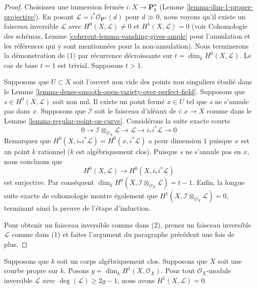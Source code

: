 \begin{proof}
Choisissez une immersion fermée $i : X \to
\mathbf{P}^n_k$ (Lemme
\ref{lemma-dim-1-proper-projective}). En posant $\mathcal{L} =
i^*\mathcal{O}_{\mathbf{P}^n}(d)$ pour $d \gg 0$, nous voyons
qu'il existe un faisceau inversible $\mathcal{L}$ avec $H^0(X,
\mathcal{L}) \not = 0$ et $H^1(X, \mathcal{L}) = 0$ (voir
Cohomologie des schémas, Lemme
\ref{coherent-lemma-vanshing-gives-ample} pour l'annulation et les
références qui y sont mentionnées pour la non-annulation). Nous
terminerons la démonstration de (1) par récurrence décroissante sur $t =
\dim_k H^0(X, \mathcal{L})$. Le cas de base $t = 1$ est trivial. Supposons $t > 1$.

\medskip\noindent
Supposons que $U \subset X$ soit l'ouvert non vide des points
non singuliers étudié dans le Lemme
\ref{lemma-dense-smooth-open-variety-over-perfect-field}. Supposons
que $s \in H^0(X, \mathcal{L})$ soit non nul. Il existe un point fermé
$x \in U$ tel que $s$ ne s'annule pas dans $x$. Supposons que
$\mathcal{I}$ soit le faisceau d'idéaux de $i : x \to X$ comme dans le
Lemme \ref{lemma-regular-point-on-curve}. Considérons la suite exacte courte
$$
0 \to \mathcal{I} \otimes_{\mathcal{O}_X} \mathcal{L} \to
\mathcal{L} \to i_*i^*\mathcal{L} \to 0
$$
Remarquez que $H^0(X, i_*i^*\mathcal{L}) = H^0(x, i^*\mathcal{L})$ a
pour dimension $1$ puisque $x$ est un point $k$ rationnel ($k$ est
algébriquement clos). Puisque $s$ ne s'annule pas en $x$, nous concluons que
$$
H^0(X, \mathcal{L}) \longrightarrow H^0(X, i_*i^*\mathcal{L})
$$
est surjective. Par conséquent $\dim_k H^0(X,
\mathcal{I} \otimes_{\mathcal{O}_X} \mathcal{L}) = t - 1$.
Enfin, la longue suite exacte de cohomologie montre
également que $H^1(X, \mathcal{I} \otimes_{\mathcal{O}_X}
\mathcal{L}) = 0$, terminant ainsi la preuve de l'étape d'induction.

\medskip\noindent
Pour obtenir un faisceau inversible comme dans (2), prenez
un faisceau inversible $\mathcal{L}$ comme dans (1) et
faites l'argument du paragraphe précédent une fois de plus.
\end{proof}

\begin{lemma}
\label{lemma-vanishing-degree-2g-and-1-line-bundle}
Supposons que $k$ soit un corps algébriquement clos. Supposons que $X$
soit une courbe propre sur $k$. Posons $g = \dim_k H^1(X,
\mathcal{O}_X)$. Pour tout $\mathcal{O}_X$-module inversible $\mathcal{L}$
avec $\deg(\mathcal{L}) \geq 2g - 1$, nous avons $H^1(X, \mathcal{L}) = 0$.
\end{lemma}

